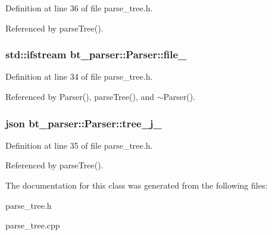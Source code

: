 Definition at line 36 of file parse\-\_\-tree.\-h.



Referenced by parse\-Tree().

\hypertarget{classbt__parser_1_1Parser_a2f2c7b9fcfd823c22b8e4385e8e2ce63_a2f2c7b9fcfd823c22b8e4385e8e2ce63}{
\subsubsection[{file\-\_\-}]{\setlength{\rightskip}{0pt plus 5cm}std\-::ifstream bt\-\_\-parser\-::\-Parser\-::file\-\_\-\hspace{0.3cm}{\ttfamily [private]}}}\label{classbt__parser_1_1Parser_a2f2c7b9fcfd823c22b8e4385e8e2ce63_a2f2c7b9fcfd823c22b8e4385e8e2ce63}


Definition at line 34 of file parse\-\_\-tree.\-h.



Referenced by Parser(), parse\-Tree(), and $\sim$\-Parser().

\hypertarget{classbt__parser_1_1Parser_abd894df8a1d8c0aaf660fc02ca1f3882_abd894df8a1d8c0aaf660fc02ca1f3882}{
\subsubsection[{tree\-\_\-j\-\_\-}]{\setlength{\rightskip}{0pt plus 5cm}json bt\-\_\-parser\-::\-Parser\-::tree\-\_\-j\-\_\-\hspace{0.3cm}{\ttfamily [private]}}}\label{classbt__parser_1_1Parser_abd894df8a1d8c0aaf660fc02ca1f3882_abd894df8a1d8c0aaf660fc02ca1f3882}


Definition at line 35 of file parse\-\_\-tree.\-h.



Referenced by parse\-Tree().



The documentation for this class was generated from the following files\-:\begin{DoxyCompactItemize}
\item 
parse\-\_\-tree.\-h\item 
parse\-\_\-tree.\-cpp\end{DoxyCompactItemize}
